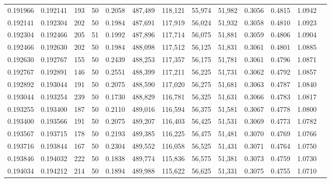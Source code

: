 \begin{tabular}{rrrrrrrrrrrrr}
0.191966 & 0.192141 &   193 &  50 &                                     0.2058 & 487,489 & 118,121 &  55,974 &  51,982 & 0.3056 & 0.4815 & 1.0942 \\
0.192141 & 0.192304 &   202 &  50 &                                     0.1984 & 487,691 & 117,919 &  56,024 &  51,932 & 0.3058 & 0.4810 & 1.0923 \\
0.192304 & 0.192466 &   205 &  51 &                                     0.1992 & 487,896 & 117,714 &  56,075 &  51,881 & 0.3059 & 0.4806 & 1.0904 \\
0.192466 & 0.192630 &   202 &  50 &                                     0.1984 & 488,098 & 117,512 &  56,125 &  51,831 & 0.3061 & 0.4801 & 1.0885 \\
0.192630 & 0.192767 &   155 &  50 &                                     0.2439 & 488,253 & 117,357 &  56,175 &  51,781 & 0.3061 & 0.4796 & 1.0871 \\
0.192767 & 0.192891 &   146 &  50 &                                     0.2551 & 488,399 & 117,211 &  56,225 &  51,731 & 0.3062 & 0.4792 & 1.0857 \\
0.192892 & 0.193044 &   191 &  50 &                                     0.2075 & 488,590 & 117,020 &  56,275 &  51,681 & 0.3063 & 0.4787 & 1.0840 \\
0.193044 & 0.193254 &   239 &  50 &                                     0.1730 & 488,829 & 116,781 &  56,325 &  51,631 & 0.3066 & 0.4783 & 1.0817 \\
0.193255 & 0.193400 &   187 &  50 &                                     0.2110 & 489,016 & 116,594 &  56,375 &  51,581 & 0.3067 & 0.4778 & 1.0800 \\
0.193400 & 0.193566 &   191 &  50 &                                     0.2075 & 489,207 & 116,403 &  56,425 &  51,531 & 0.3069 & 0.4773 & 1.0782 \\
0.193567 & 0.193715 &   178 &  50 &                                     0.2193 & 489,385 & 116,225 &  56,475 &  51,481 & 0.3070 & 0.4769 & 1.0766 \\
0.193716 & 0.193844 &   167 &  50 &                                     0.2304 & 489,552 & 116,058 &  56,525 &  51,431 & 0.3071 & 0.4764 & 1.0750 \\
0.193846 & 0.194032 &   222 &  50 &                                     0.1838 & 489,774 & 115,836 &  56,575 &  51,381 & 0.3073 & 0.4759 & 1.0730 \\
0.194034 & 0.194212 &   214 &  50 &                                     0.1894 & 489,988 & 115,622 &  56,625 &  51,331 & 0.3075 & 0.4755 & 1.0710 \\

\end{tabular}

